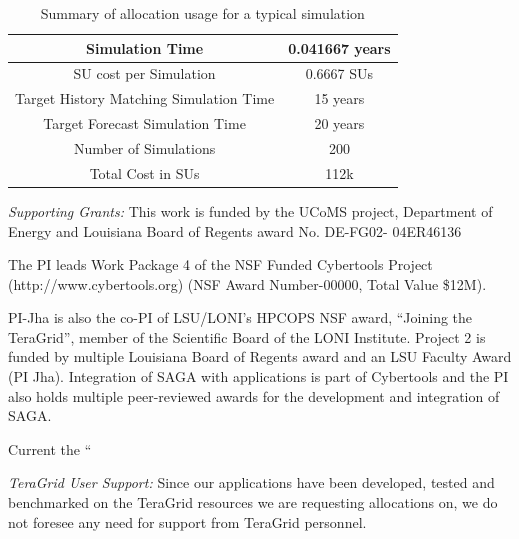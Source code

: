 \documentclass[a4paper,10pt]{article}
\begin{document}
\begin{table}[!h]
\begin{center}
 \caption{Summary of allocation usage for a typical simulation}
\begin{tabular}{| c | c |}
\hline
Simulation Time & 0.041667 years \\ 
\hline
SU cost per Simulation & 0.6667 SUs \\ 
\hline
Target History Matching Simulation Time & 15 years \\ 
\hline
Target Forecast Simulation Time & 20 years \\ 
\hline
Number of Simulations & 200 \\ 
\hline
Total Cost in SUs & 112k\\
\hline
\end{tabular}
\end{center}
\end{table}


{\it Supporting Grants:} This work is funded by the UCoMS project, Department of Energy and Louisiana Board of Regents
award No. DE-FG02- 04ER46136 

The PI leads Work Package 4 of the NSF Funded Cybertools Project
(http://www.cybertools.org) (NSF Award Number-00000, Total Value
\$12M).

PI-Jha is also the co-PI of LSU/LONI's HPCOPS NSF award, ``Joining the TeraGrid'', member of the Scientific Board of the LONI Institute.  Project 2 is funded by multiple Louisiana Board of Regents award and an LSU Faculty Award (PI Jha). Integration of SAGA with applications is part of Cybertools and the PI also holds multiple peer-reviewed awards for the development and integration of SAGA.

Current the ``



{\it TeraGrid User Support:} Since our applications have been developed, tested and benchmarked on the TeraGrid resources
we are requesting allocations on, we do not foresee any need for support from TeraGrid personnel.






\end{document}
